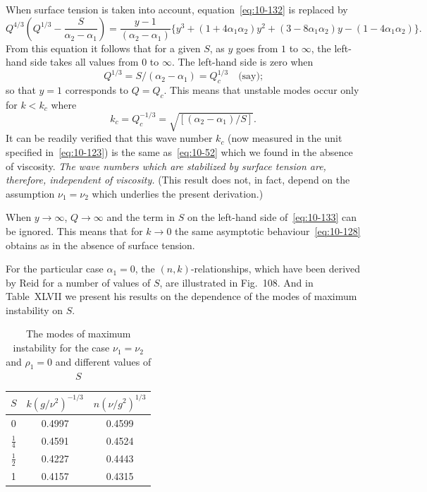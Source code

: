 When surface tension is taken into account, equation~\eqref{eq:10-132} is replaced by
\begin{equation}
\label{eq:10-133}
Q^{4/3}\!\left(Q^{1/3}-\frac{S}{\alpha_2-\alpha_1}\right) = \frac{y-1}{(\alpha_2-\alpha_1)}\{y^3+(1+4\alpha_1\alpha_2)y^2+(3-8\alpha_1\alpha_2)y-(1-4\alpha_1\alpha_2)\}.
\end{equation}
From this equation it follows that for a given $S$, as $y$ goes from $1$ to $\infty$, the left-hand side takes all values from 0 to $\infty$. The left-hand side is zero when
\begin{equation}
\label{eq:10-134}
Q^{1/3} = S/(\alpha_2-\alpha_1) = Q_c^{1/3} \quad\text{(say);}
\end{equation}
so that $y = 1$ corresponds to $Q = Q_c$. This means that unstable modes occur only for $k < k_c$ where
\begin{equation}
\label{eq:10-135}
k_c = Q_c^{-1/3} = \sqrt{[(\alpha_2-\alpha_1)/S]}.
\end{equation}
It can be readily verified that this wave number $k_c$ (now measured in the unit specified in~\eqref{eq:10-123}) is the same as~\eqref{eq:10-52} which we found in the absence of viscosity. \emph{The wave numbers which are stabilized by surface tension are, therefore, independent of viscosity.} (This result does not, in fact, depend on the assumption $\nu_1 = \nu_2$ which underlies the present derivation.)

When $y \to \infty$, $Q \to \infty$ and the term in $S$ on the left-hand side of~\eqref{eq:10-133} can be ignored. This means that for $k \to 0$ the same asymptotic behaviour~\eqref{eq:10-128} obtains as in the absence of surface tension.

For the particular case $\alpha_1 = 0$, the $(n, k)$-relationships, which have been derived by Reid for a number of values of $S$, are illustrated in Fig.~108. And in Table~XLVII we present his results on the dependence of the modes of maximum instability on $S$.

\begin{table}[ht]
\centering
\caption{The modes of maximum instability for the case $\nu_1 = \nu_2$ and $\rho_1 = 0$ and different values of $S$}
\label{tab:XLVII}
\small
\begin{tabular}{ccc}
\hline
$S$ & $k(g/\nu^2)^{-1/3}$ & $n(\nu/g^2)^{1/3}$ \\
\hline
0 & 0.4997 & 0.4599 \\
$\frac{1}{4}$ & 0.4591 & 0.4524 \\
$\frac{1}{2}$ & 0.4227 & 0.4443 \\
1 & 0.4157 & 0.4315 \\
\hline
\end{tabular}
\end{table}

